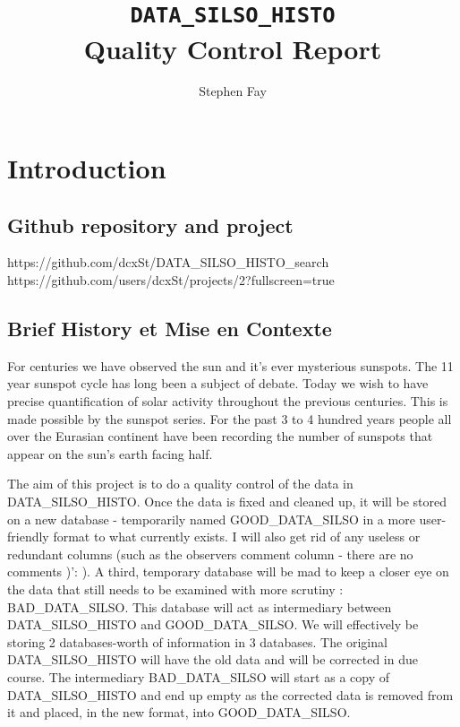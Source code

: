 \documentclass[12pt]{article}
\renewcommand\qedsymbol{$\Smiley$}
\begin{document}
 
 
\title{\texttt{DATA\_SILSO\_HISTO}\\Quality Control Report}
\author{Stephen Fay}
\maketitle

\tableofcontents

\section{Introduction}
\subsection{Github repository and project}
    https://github.com/dcxSt/DATA\_SILSO\_HISTO\_search \\
    https://github.com/users/dcxSt/projects/2?fullscreen=true
    
\subsection{Brief History et Mise en Contexte}

For centuries we have observed the sun and it's ever mysterious sunspots. The 11 year sunspot cycle has long been a subject of debate. Today we wish to have precise quantification of solar activity throughout the previous centuries. This is made possible by the sunspot series. For the past 3 to 4 hundred years people all over the Eurasian continent have been recording the number of sunspots that appear on the sun's earth facing half. 

The aim of this project is to do a quality control of the data in DATA\_SILSO\_HISTO. Once the data is fixed and cleaned up, it will be stored on a new database - temporarily named GOOD\_DATA\_SILSO in a more user-friendly format to what currently exists. I will also get rid of any useless or redundant columns (such as the observers comment column - there are no comments )': ). A third, temporary database will be mad to keep a closer eye on the data that still needs to be examined with more scrutiny : BAD\_DATA\_SILSO. This database will act as intermediary between DATA\_SILSO\_HISTO and GOOD\_DATA\_SILSO. We will effectively be storing 2 databases-worth of information in 3 databases. The original DATA\_SILSO\_HISTO will have the old data and will be corrected in due course. The intermediary BAD\_DATA\_SILSO will start as a copy of DATA\_SILSO\_HISTO and end up empty as the corrected data is removed from it and placed, in the new format, into GOOD\_DATA\_SILSO.
\end{document}
